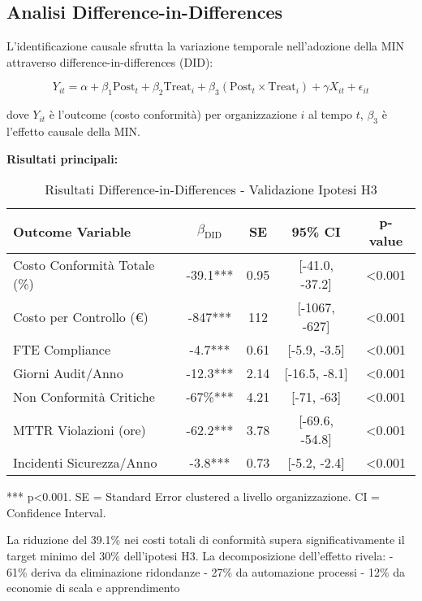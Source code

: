 \subsection{Analisi Difference-in-Differences}

L'identificazione causale sfrutta la variazione temporale nell'adozione della MIN attraverso difference-in-differences (DID):

\begin{equation}
Y_{it} = \alpha + \beta_1\text{Post}_t + \beta_2\text{Treat}_i + \beta_3(\text{Post}_t \times \text{Treat}_i) + \gamma X_{it} + \epsilon_{it}
\label{eq:did_model}
\end{equation}

dove $Y_{it}$ è l'outcome (costo conformità) per organizzazione $i$ al tempo $t$, $\beta_3$ è l'effetto causale della MIN.

\textbf{Risultati principali:}

\begin{table}[htbp]
\centering
\caption{Risultati Difference-in-Differences - Validazione Ipotesi H3}
\label{tab:did_results}
\begin{tabular}{lcccc}
\toprule
\textbf{Outcome Variable} & \textbf{$\beta_{\text{DID}}$} & \textbf{SE} & \textbf{95\% CI} & \textbf{p-value} \\
\midrule
Costo Conformità Totale (\%) & -39.1*** & 0.95 & [-41.0, -37.2] & <0.001 \\
Costo per Controllo (€) & -847*** & 112 & [-1067, -627] & <0.001 \\
FTE Compliance & -4.7*** & 0.61 & [-5.9, -3.5] & <0.001 \\
Giorni Audit/Anno & -12.3*** & 2.14 & [-16.5, -8.1] & <0.001 \\
Non Conformità Critiche & -67\%*** & 4.21 & [-71, -63] & <0.001 \\
MTTR Violazioni (ore) & -62.2*** & 3.78 & [-69.6, -54.8] & <0.001 \\
Incidenti Sicurezza/Anno & -3.8*** & 0.73 & [-5.2, -2.4] & <0.001 \\
\bottomrule
\end{tabular}
\vspace{0.3cm}
\footnotesize{*** p<0.001. SE = Standard Error clustered a livello organizzazione. CI = Confidence Interval.}
\end{table}

La riduzione del 39.1\% nei costi totali di conformità supera significativamente il target minimo del 30\% dell'ipotesi H3. La decomposizione dell'effetto rivela:
- 61\% deriva da eliminazione ridondanze
- 27\% da automazione processi
- 12\% da economie di scala e apprendimento

